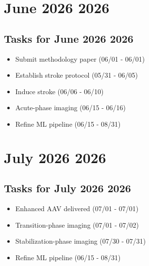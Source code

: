 \documentclass[landscape,a4paper]{article}
\begin{document}
\section*{June 2026 2026}

\begin{center}
\begin{tikzpicture}[scale=0.9]
\end{tikzpicture}
\end{center}

\vspace{1cm}

\subsection*{Tasks for June 2026 2026}
\begin{itemize}
\item Submit methodology paper (06/01 - 06/01)
\item Establish stroke protocol (05/31 - 06/05)
\item Induce stroke (06/06 - 06/10)
\item Acute-phase imaging (06/15 - 06/16)
\item Refine ML pipeline (06/15 - 08/31)
\end{itemize}
\newpage

\section*{July 2026 2026}

\begin{center}
\begin{tikzpicture}[scale=0.9]
\end{tikzpicture}
\end{center}

\vspace{1cm}

\subsection*{Tasks for July 2026 2026}
\begin{itemize}
\item Enhanced AAV delivered (07/01 - 07/01)
\item Transition-phase imaging (07/01 - 07/02)
\item Stabilization-phase imaging (07/30 - 07/31)
\item Refine ML pipeline (06/15 - 08/31)
\end{itemize}
\newpage
\end{document}
